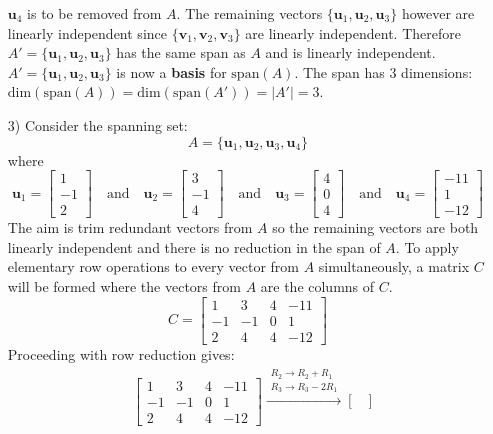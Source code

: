 \documentclass{article}
\begin{document}
\begin{itemize}
\(\mathbf{u}_4\) is to be removed from \(A\). The remaining vectors \(\{\mathbf{u}_1, \mathbf{u}_2, \mathbf{u}_3\}\) however are linearly independent since \(\{\mathbf{v}_1, \mathbf{v}_2, \mathbf{v}_3\}\) are linearly independent. Therefore \(A' = \{\mathbf{u}_1, \mathbf{u}_2, \mathbf{u}_3\}\) has the same span as \(A\) and is linearly independent. \(A' = \{\mathbf{u}_1, \mathbf{u}_2, \mathbf{u}_3\}\) is now a {\bf basis} for \(\text{span}(A)\). The span has \(3\) dimensions: \(\text{dim}(\text{span}(A)) = \text{dim}(\text{span}(A')) = |A'| = 3\).
\item[3)] Consider the spanning set:
\[A = \{\mathbf{u}_1, \mathbf{u}_2, \mathbf{u}_3, \mathbf{u}_4\}\]
where
\[\mathbf{u}_1 = \begin{bmatrix}
1 \\ -1 \\ 2  
\end{bmatrix} \quad\text{and}\quad \mathbf{u}_2 =\begin{bmatrix} 
3 \\ -1 \\ 4 
\end{bmatrix} \quad\text{and}\quad \mathbf{u}_3 = \begin{bmatrix} 
4 \\ 0 \\ 4 
\end{bmatrix} \quad\text{and}\quad \mathbf{u}_4 = \begin{bmatrix}
-11 \\ 1 \\ -12 
\end{bmatrix}\] 
The aim is trim redundant vectors from \(A\) so the remaining vectors are both linearly independent and there is no reduction in the span of \(A\). To apply elementary row operations to every vector from \(A\) simultaneously, a matrix \(C\) will be formed where the vectors from \(A\) are the columns of \(C\).
\[C = \begin{bmatrix}
 1 &  3 &  4 & -11 \\
-1 & -1 & 0 &    1 \\
 2 &  4 & 4 & -12 
\end{bmatrix}\]
Proceeding with row reduction gives:
\begin{align*}
& \begin{bmatrix}
 1 &  3 &  4 & -11 \\
-1 & -1 & 0 &    1 \\
 2 &  4 & 4 & -12 
\end{bmatrix} \xrightarrow{\begin{array}{c} R_2 \rightarrow R_2 + R_1 \\ R_3 \rightarrow R_3 - 2R_1 \end{array}} \begin{bmatrix}

\end{bmatrix}
\end{align*}
\end{itemize}
\end{document}
